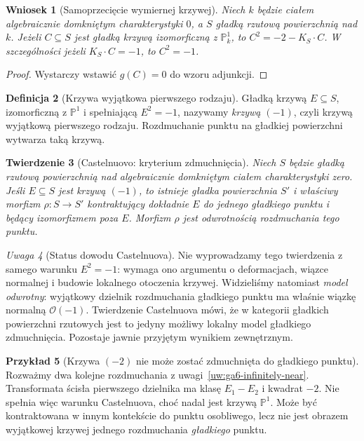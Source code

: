 \documentclass[11pt,a4paper,openany]{report}
\numberwithin{equation}{section}
\theoremstyle{plain}
\newtheorem{twierdzenie}{Twierdzenie}[section]
\newtheorem{wniosek}[twierdzenie]{Wniosek}
\theoremstyle{definition}
\newtheorem{definicja}[twierdzenie]{Definicja}
\newtheorem{przyklad}[twierdzenie]{Przykład}
\theoremstyle{remark}
\newtheorem{uwaga}[twierdzenie]{Uwaga}
\newcommand{\PP}{\mathbb P}
\begin{document}
\begin{wniosek}[Samoprzecięcie wymiernej krzywej]
\label{wn:ga6-rational-adjunction}
Niech $k$ będzie ciałem algebraicznie domkniętym
charakterystyki $0$, a $S$ gładką rzutową powierzchnią
nad $k$. Jeżeli $C\subseteq S$ jest gładką krzywą
izomorficzną z $\PP^1_k$, to
$C^2=-2-K_S\cdot C$.
W szczególności jeżeli $K_S\cdot C=-1$, to $C^2=-1$.
\end{wniosek}
\begin{proof}
Wystarczy wstawić $g(C)=0$ do wzoru adjunkcji.
\end{proof}

\begin{definicja}[Krzywa wyjątkowa pierwszego rodzaju]
Gładką krzywą $E\subseteq S$, izomorficzną z
$\PP^1$ i spełniającą $E^2=-1$, nazywamy
\emph{krzywą $(-1)$}, czyli krzywą wyjątkową
pierwszego rodzaju. Rozdmuchanie punktu na gładkiej
powierzchni wytwarza taką krzywą.
\end{definicja}

\begin{twierdzenie}[Castelnuovo: kryterium zdmuchnięcia]
\label{tw:ga6-castelnuovo}
Niech $S$ będzie gładką rzutową powierzchnią nad
algebraicznie domkniętym ciałem charakterystyki zero.
Jeśli $E\subseteq S$ jest krzywą $(-1)$, to istnieje
gładka powierzchnia $S'$ i właściwy morfizm
$\rho:S\to S'$ kontraktujący dokładnie $E$ do jednego
gładkiego punktu i będący izomorfizmem poza $E$.
Morfizm $\rho$ jest odwrotnością rozdmuchania tego punktu.
\end{twierdzenie}

\begin{uwaga}[Status dowodu Castelnuova]
Nie wyprowadzamy tego twierdzenia z samego warunku
$E^2=-1$: wymaga ono argumentu o deformacjach,
wiązce normalnej i budowie lokalnego otoczenia krzywej.
Widzieliśmy natomiast \emph{model odwrotny}: wyjątkowy
dzielnik rozdmuchania gładkiego punktu ma właśnie
wiązkę normalną $\mathcal O(-1)$. Twierdzenie
Castelnuova mówi, że w kategorii gładkich powierzchni
rzutowych jest to jedyny możliwy lokalny model
gładkiego zdmuchnięcia. Pozostaje jawnie przyjętym
wynikiem zewnętrznym.
\end{uwaga}

\begin{przyklad}[Krzywa $(-2)$ nie może zostać zdmuchnięta do gładkiego punktu]
Rozważmy dwa kolejne rozdmuchania z
uwagi~\ref{uw:ga6-infinitely-near}. Transformata
ścisła pierwszego dzielnika ma klasę $E_1-E_2$
i kwadrat $-2$. Nie spełnia więc warunku
Castelnuova, choć nadal jest krzywą $\PP^1$.
Może być kontraktowana w innym kontekście do
punktu osobliwego, lecz nie jest obrazem wyjątkowej
krzywej jednego rozdmuchania \emph{gładkiego} punktu.
\end{przyklad}
\end{document}
